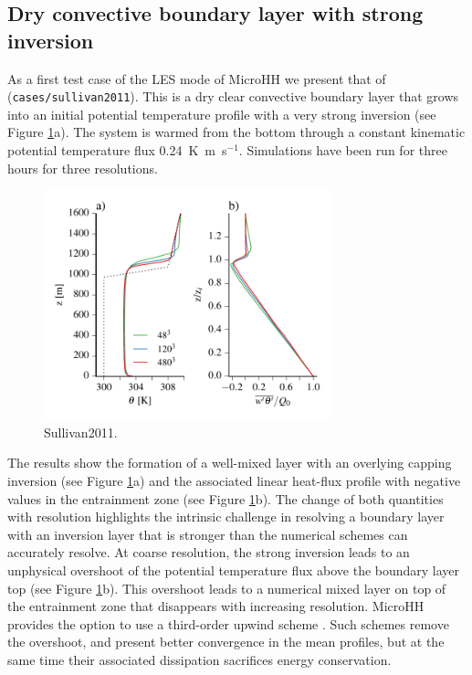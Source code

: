 \documentclass[gmd]{copernicus}
\begin{document}
\subsection{Dry convective boundary layer with strong inversion}
As a first test case of the LES mode of MicroHH we present that of \citet{Sullivan2011} (\texttt{cases/sullivan2011}). This is a dry clear convective boundary layer that grows into an initial potential temperature profile with a very strong inversion (see Figure \ref{fig:sullivan2011}a). The system is warmed from the bottom through a constant kinematic potential temperature flux 0.24~K~m~s$^{-1}$. Simulations have been run for three hours for three resolutions.
\begin{figure}[t]
	\vspace*{2mm}
	\begin{center}
		\includegraphics[width=8.3cm]{figs/sullivan2011.pdf}
	\end{center}
	\caption{Sullivan2011.}
	\label{fig:sullivan2011}
\end{figure}

The results show the formation of a well-mixed layer with an overlying capping inversion (see Figure \ref{fig:sullivan2011}a) and the associated linear heat-flux profile with negative values in the entrainment zone (see Figure \ref{fig:sullivan2011}b). The change of both quantities with resolution highlights the intrinsic challenge in resolving a boundary layer with an inversion layer that is stronger than the numerical schemes can accurately resolve. At coarse resolution, the strong inversion leads to an unphysical overshoot of the potential temperature flux above the boundary layer top (see Figure \ref{fig:sullivan2011}b). This overshoot leads to a numerical mixed layer on top of the entrainment zone  that disappears with increasing resolution. MicroHH provides the option to use a third-order upwind scheme \citep{Wicker2002}. Such schemes remove the overshoot, and present better convergence in the mean profiles, but at the same time their associated dissipation sacrifices energy conservation.
\end{document}
